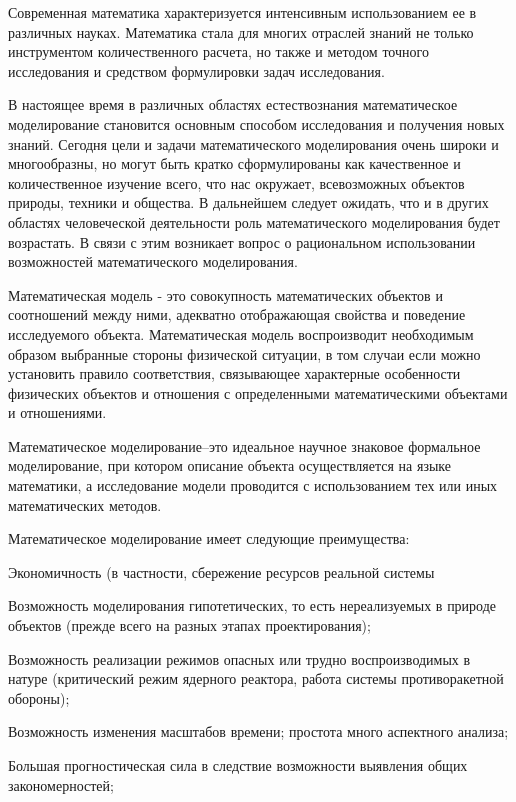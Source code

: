 
Современная математика характеризуется интенсивным использованием ее в различных науках. Математика стала для многих отраслей знаний не только инструментом количественного расчета, но также и методом точного исследования и средством формулировки задач исследования.


В настоящее время в различных областях естествознания математическое моделирование становится основным способом исследования и получения новых знаний. Сегодня цели и задачи математического моделирования очень широки и многообразны, но могут быть кратко сформулированы как качественное и количественное изучение всего, что нас окружает, всевозможных объектов природы, техники и общества. В дальнейшем следует ожидать, что и в других областях человеческой деятельности роль математического моделирования будет возрастать. В связи с этим возникает вопрос о рациональном использовании возможностей математического моделирования.


Математическая модель - это совокупность математических объектов и соотношений между ними, адекватно отображающая свойства и поведение исследуемого объекта. Математическая модель воспроизводит необходимым образом выбранные стороны физической ситуации, в том случаи если можно установить правило соответствия, связывающее характерные особенности физических объектов и отношения с определенными математическими объектами и отношениями.


Математическое моделирование–это идеальное научное знаковое формальное моделирование, при котором описание объекта осуществляется на языке математики, а исследование модели проводится с использованием тех или иных математических методов. 


Математическое моделирование имеет следующие преимущества:


Экономичность (в частности, сбережение ресурсов реальной системы


Возможность моделирования гипотетических, то есть нереализуемых в природе объектов (прежде всего на разных этапах проектирования);


Возможность реализации режимов опасных или трудно воспроизводимых в натуре (критический режим ядерного реактора, работа системы противоракетной обороны);


Возможность изменения масштабов времени; простота много аспектного анализа;


Большая прогностическая сила в следствие возможности выявления общих закономерностей;


